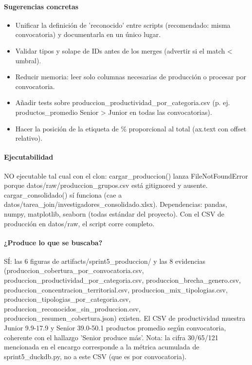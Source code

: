 \paragraph{Sugerencias concretas}
\begin{itemize}
  \item Unificar la definición de 'reconocido' entre scripts (recomendado: misma convocatoria) y documentarla en un único lugar.
  \item Validar tipos y solape de IDs antes de los merges (advertir si el match < umbral).
  \item Reducir memoria: leer solo columnas necesarias de producción o procesar por convocatoria.
  \item Añadir tests sobre produccion\_productividad\_por\_categoria.csv (p. ej. productos\_promedio Senior > Junior en todas las convocatorias).
  \item Hacer la posición de la etiqueta de \% proporcional al total (ax.text con offset relativo).
\end{itemize}

\paragraph{Ejecutabilidad}
NO ejecutable tal cual con el clon: cargar\_produccion() lanza FileNotFoundError porque datos/raw/produccion\_grupos.csv está gitignored y ausente. cargar\_consolidado() sí funciona (cae a datos/tarea\_join/investigadores\_consolidado.xlsx). Dependencias: pandas, numpy, matplotlib, seaborn (todas estándar del proyecto). Con el CSV de producción en datos/raw, el script corre completo.

\paragraph{¿Produce lo que se buscaba?}
SÍ: las 6 figuras de artifacts/sprint5\_produccion/ y las 8 evidencias (produccion\_cobertura\_por\_convocatoria.csv, produccion\_productividad\_por\_categoria.csv, produccion\_brecha\_genero.csv, produccion\_concentracion\_territorial.csv, produccion\_mix\_tipologias.csv, produccion\_tipologias\_por\_categoria.csv, produccion\_reconocidos\_sin\_produccion.csv, produccion\_resumen\_cobertura.json) existen. El CSV de productividad muestra Junior 9.9-17.9 y Senior 39.0-50.1 productos promedio según convocatoria, coherente con el hallazgo 'Senior produce más'. Nota: la cifra 30/65/121 mencionada en el encargo corresponde a la métrica acumulada de sprint5\_duckdb.py, no a este CSV (que es por convocatoria).


